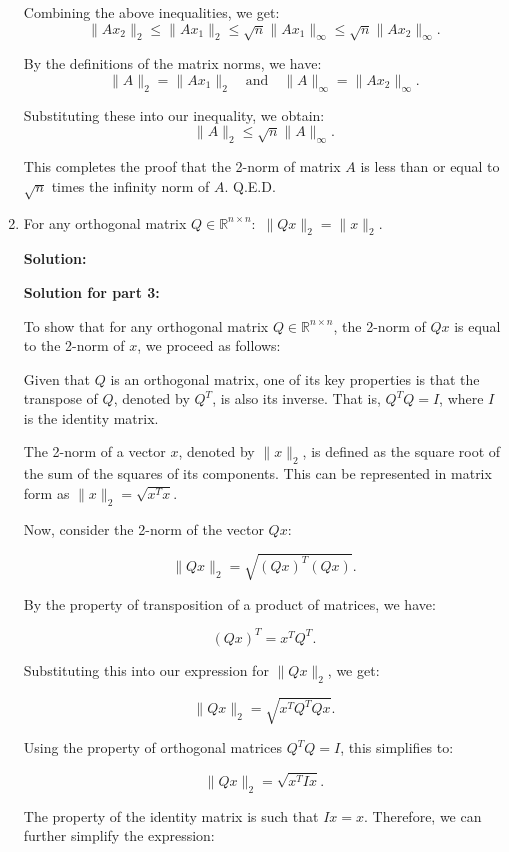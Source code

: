 \documentclass[11pt,onecolumn]{article}
\newcommand{\R}{\mathbb{R}}
\begin{document}
\begin{enumerate}
Combining the above inequalities, we get:
\[
\|Ax_2\|_2 \leq \|Ax_1\|_2 \leq \sqrt{n} \|Ax_1\|_{\infty} \leq \sqrt{n} \|Ax_2\|_{\infty}.
\]

By the definitions of the matrix norms, we have:
\[
\|A\|_2 = \|Ax_1\|_2 \quad \text{and} \quad \|A\|_{\infty} = \|Ax_2\|_{\infty}.
\]

Substituting these into our inequality, we obtain:
\[
\|A\|_2 \leq \sqrt{n} \|A\|_{\infty}.
\]

This completes the proof that the 2-norm of matrix \( A \) is less than or equal to \( \sqrt{n} \) times the infinity norm of \( A \). Q.E.D.






\item For any orthogonal matrix $Q\in \R^{n\times n}:$ $\|Qx\|_2 = \|x\|_2.$


\textbf{Solution:}




\textbf{Solution for part 3:}

To show that for any orthogonal matrix \( Q \in \mathbb{R}^{n \times n} \), the 2-norm of \( Qx \) is equal to the 2-norm of \( x \), we proceed as follows:

Given that \( Q \) is an orthogonal matrix, one of its key properties is that the transpose of \( Q \), denoted by \( Q^T \), is also its inverse. That is, \( Q^T Q = I \), where \( I \) is the identity matrix.

The 2-norm of a vector \( x \), denoted by \( \|x\|_2 \), is defined as the square root of the sum of the squares of its components. This can be represented in matrix form as \( \|x\|_2 = \sqrt{x^T x} \).

Now, consider the 2-norm of the vector \( Qx \):

\[
\|Qx\|_2 = \sqrt{(Qx)^T(Qx)}.
\]

By the property of transposition of a product of matrices, we have:

\[
(Qx)^T = x^T Q^T.
\]

Substituting this into our expression for \( \|Qx\|_2 \), we get:

\[
\|Qx\|_2 = \sqrt{x^T Q^T Qx}.
\]

Using the property of orthogonal matrices \( Q^T Q = I \), this simplifies to:

\[
\|Qx\|_2 = \sqrt{x^T I x}.
\]

The property of the identity matrix is such that \( Ix = x \). Therefore, we can further simplify the expression:


\end{enumerate}
\end{document}
